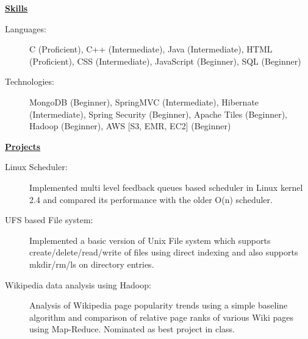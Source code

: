 \documentclass[letterpaper,11pt]{article}
\newcommand{\resheading}[1]{{\large \colorbox{mygrey}{\begin{minipage}{\textwidth}{\textbf{#1 \vphantom{p\^{E}}}}\end{minipage}}}}
\begin{document}
\resheading{\href{http://www.ashish-jindal.com/}{Skills}}
	\begin{description}
		\item[Languages:] { \footnotesize C (Proficient), C++ (Intermediate), Java (Intermediate), HTML (Proficient), CSS (Intermediate), JavaScript (Beginner), SQL (Beginner)
		}
		\item[Technologies:] { \footnotesize
			MongoDB (Beginner), SpringMVC (Intermediate), Hibernate (Intermediate), Spring Security (Beginner), Apache Tiles (Beginner), Hadoop (Beginner), AWS [S3, EMR, EC2] (Beginner)
		}

	\end{description} %

\resheading{\href{http://www.ashish-jindal.com/}{Projects}}

\begin{description}
\item[Linux Scheduler:] { \footnotesize Implemented multi level feedback queues based scheduler in Linux kernel 2.4 and compared its performance with the older O(n) scheduler.}

\item[UFS based File system:] { \footnotesize Implemented a basic version of Unix File system which supports create/delete/read/write of files using direct indexing and also supports mkdir/rm/ls on directory entries.}

\item[Wikipedia data analysis using Hadoop:] { \footnotesize Analysis of Wikipedia page popularity trends using a simple baseline algorithm and comparison of relative page ranks of various Wiki pages using Map-Reduce. Nominated as best project in class.}
\end{description}
\end{document}
